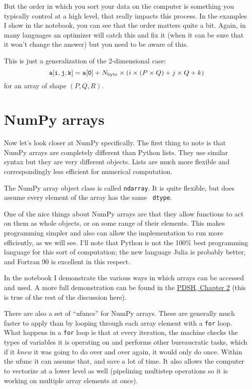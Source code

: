 But the order in which you sort your data on the computer is something
you typically control at a high level, that really impacts this
process. In the examples I show in the notebook, you can see that the
order matters quite a bit. Again, in many languages an optimizer will
catch this and fix it (when it can be sure that it won't change the
answer) but you need to be aware of this.


\begin{answer}
This is just a generalization of the 2-dimensional case:
\begin{equation}
  {\tt a[i, j, k]} = {\tt a[0]} + N_{\rm byte} \times (i \times (P
  \times Q) + j \times Q + k)
\end{equation}
for an array of shape $(P, Q, R)$.
\end{answer}

\section{NumPy arrays}

Now let's look closer at NumPy specifically. The first thing to note
is that NumPy arrays are completely different than Python lists. They
use similar syntax but they are very different objects. Lists are much
more flexible and correspondingly less efficient for numerical
computation.

The NumPy array object class is called {\tt ndarray}. It is quite
flexible, but does assume every element of the array has the same {\tt
  dtype}. 

One of the nice things about NumPy arrays are that they allow
functions to act on them as whole objects, or on some range of their
elements. This makes programming simpler and also can allow the
implementation to run more efficiently, as we will see. I'll note that
Python is not the 100\% best programming language for this sort of
computation; the new language Julia is probably better, and Fortran 90
is excellent in this respect. 

In the notebook I demonstrate the various ways in which arrays can be
accessed and used. A more full demonstration can be found in the
\href{https://github.com/jakevdp/PythonDataScienceHandbook/tree/de0cc6bd317012d50ab3dd06e3cf4e256de1973f/notebooks}{PDSH,
  Chapter 2} (this is true of the rest of the discussion here).

There are also a set of ``ufuncs'' for NumPy arrays. These are
generally much faster to apply than by looping through each array
element with a {\tt for} loop. What happens in a {\tt for} loop is
that at every iteration, the machine checks the types of variables it
is operating on and performs other bureaucratic tasks, which if it
{\it knew} it was going to do over and over again, it would only do
once. Within the ufunc it can assume that, and save a lot of time. It
also allows the computer to vectorize at a lower level as well
(pipelining multistep operations so it is working on multiple array
elements at once). 

